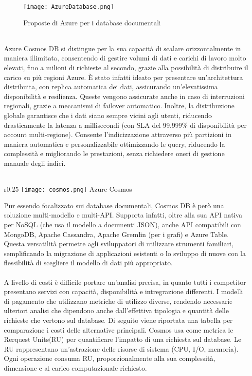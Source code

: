 \begin{figure}[h!]
    \centering
    \texttt{[image: AzureDatabase.png]}
    \caption{Proposte di Azure per i database documentali}
\end{figure}
\\
Azure Cosmos DB si distingue per la sua capacità di scalare orizzontalmente in maniera illimitata,
consentendo di gestire volumi di dati e carichi di lavoro molto elevati,
fino a milioni di richieste al secondo,
grazie alla possibilità di distribuire il carico su più regioni Azure.
È stato infatti ideato per presentare un'architettura distribuita,
con replica automatica dei dati,
assicurando un'elevatissima disponibilità e resilienza.
Queste vengono assicurate anche in caso di interruzioni regionali,
grazie a meccanismi di failover automatico.
Inoltre, la distribuzione globale garantisce che i dati siano sempre vicini agli utenti,
riducendo drasticamente la latenza a millisecondi
(con SLA del 99.999\% di disponibilità per account multi-regione).
Consente l'indicizzazione attraverso più partizioni in maniera
automatica e personalizzabile ottimizzando le query,
riducendo la complessità e migliorando le prestazioni,
senza richiedere oneri di gestione manuale degli indici.\\
\\
\begin{wrapfigure}{r}{0.25\textwidth}
    \centering
    \texttt{[image: cosmos.png]}
    Azure Cosmos
\end{wrapfigure}
Pur essendo focalizzato sui database documentali,
Cosmos DB è però una soluzione multi-modello e multi-API.
Supporta infatti, oltre alla sua API nativa per NoSQL (che usa il modello a documenti JSON),
anche API compatibili con MongoDB, Apache Cassandra, Apache Gremlin (per i grafi) e Azure Table.
Questa versatilità permette agli sviluppatori di utilizzare strumenti familiari,
semplificando la migrazione di applicazioni esistenti o
lo sviluppo di nuove con la flessibilità di scegliere il modello di dati più appropriato.\\
\\
A livello di costi è difficile portare un'analisi precisa,
in quanto tutti i competitor presentano servizi
con capacità, disponibilità e intregrazione differenti.
I modelli di pagamento che utilizzano metriche di utilizzo diverse,
rendendo necessarie ulteriori analisi che dipendono anche
dall'effettiva tipologia e quantità delle richieste che vertono sul database.
Di seguito viene riportata una tabella per comparazione i costi delle alternative principali.
Cosmos usa come metrica le Rerquest Units(RU) per quantificare l'impatto di una richiesta sul database.
Le RU rappresentano un'astrazione delle risorse di sistema (CPU, I/O, memoria).
Ogni operazione consuma RU, proporzionalmente alla sua
complessità, dimensione e al carico computazionale richiesto.\\

